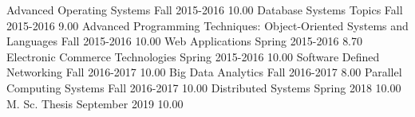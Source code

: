 \begin{grades}
    \begin{gradesgrouping}[]
            {Advanced Operating Systems}
            {Fall}
            {2015-2016}
            {10.00}
            {Database Systems Topics}
            {Fall}
            {2015-2016}
            {9.00}
            {Advanced Programming Techniques: Object-Oriented Systems and Languages}
            {Fall}
            {2015-2016}
            {10.00}
            {Web Applications}
            {Spring}
            {2015-2016}
            {8.70}
            {Electronic Commerce Technologies}
            {Spring}
            {2015-2016}
            {10.00}
            {Software Defined Networking}
            {Fall}
            {2016-2017}
            {10.00}
            {Big Data Analytics}
            {Fall}
            {2016-2017}
            {8.00}
            {Parallel Computing Systems}
            {Fall}
            {2016-2017}
            {10.00}
            {Distributed Systems}
            {Spring}
            {2018}
            {10.00}
            {M. Sc. Thesis}
            {September}
            {2019}
            {10.00}
    \end{gradesgrouping}
\end{grades}
